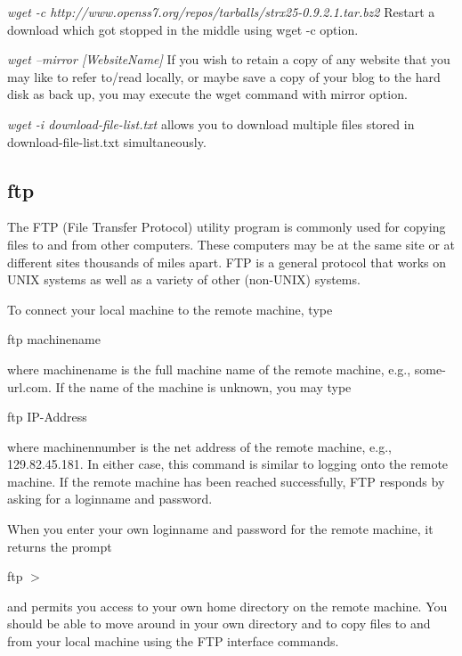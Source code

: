 \documentclass{article}
\begin{document}
\hspace{10mm} \textit {wget -c http://www.openss7.org/repos/tarballs/strx25-0.9.2.1.tar.bz2} Restart a download which got stopped in the middle using wget -c option.

\hspace{10mm} \textit{wget --mirror [WebsiteName]} If you wish to retain a copy of any website that you may like to refer to/read locally, or maybe save a copy of your blog to the hard disk as back up, you may execute the wget command with mirror option.

\hspace{10mm} \textit{wget -i download-file-list.txt} allows you to download multiple files stored in download-file-list.txt simultaneously.



\newpage

\subsection {ftp}

The FTP \cite{ftpweb1} \cite{ftpweb2} (File Transfer Protocol) utility program is commonly used for copying files to and from other computers. These computers may be at the same site or at different sites thousands of miles apart. FTP is a general protocol that works on UNIX systems as well as a variety of other (non-UNIX) systems.

To connect your local machine to the remote machine, type

\hspace{10mm} ftp machinename

where machinename is the full machine name of the remote machine, e.g., some-url.com. If the name of the machine is unknown, you may type

\hspace{10mm}ftp IP-Address

where machinennumber is the net address of the remote machine, e.g., 129.82.45.181. In either case, this command is similar to logging onto the remote machine. If the remote machine has been reached successfully, FTP responds by asking for a loginname and password.

When you enter your own loginname and password for the remote machine, it returns the prompt

\hspace{10mm}ftp $>$

and permits you access to your own home directory on the remote machine. You should be able to move around in your own directory and to copy files to and from your local machine using the FTP interface commands.
\end{document}
